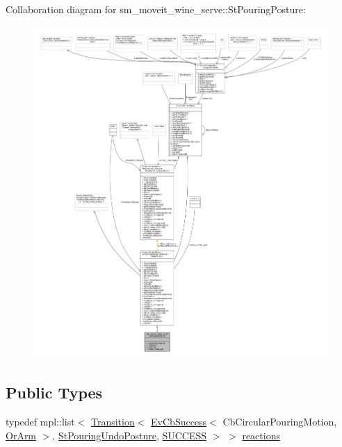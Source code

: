Collaboration diagram for sm\+\_\+moveit\+\_\+wine\+\_\+serve\+:\+:St\+Pouring\+Posture\+:
\nopagebreak
\begin{figure}[H]
\begin{center}
\leavevmode
\includegraphics[width=350pt]{structsm__moveit__wine__serve_1_1StPouringPosture__coll__graph}
\end{center}
\end{figure}
\subsection*{Public Types}
\begin{DoxyCompactItemize}
\item 
typedef mpl\+::list$<$ \hyperlink{classsmacc_1_1Transition}{Transition}$<$ \hyperlink{structsmacc_1_1EvCbSuccess}{Ev\+Cb\+Success}$<$ Cb\+Circular\+Pouring\+Motion, \hyperlink{classsm__moveit__wine__serve_1_1OrArm}{Or\+Arm} $>$, \hyperlink{structsm__moveit__wine__serve_1_1StPouringUndoPosture}{St\+Pouring\+Undo\+Posture}, \hyperlink{structsmacc_1_1default__transition__tags_1_1SUCCESS}{S\+U\+C\+C\+E\+SS} $>$ $>$ \hyperlink{structsm__moveit__wine__serve_1_1StPouringPosture_a6ee3787a121256e15cdbdfa5864810fa}{reactions}
\end{DoxyCompactItemize}
